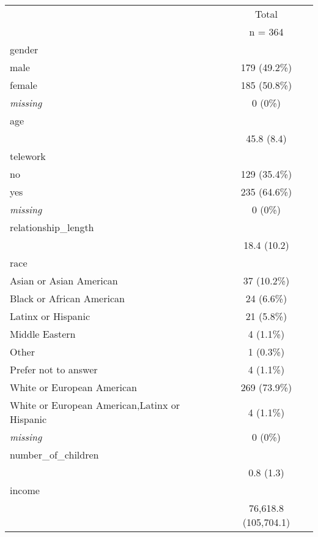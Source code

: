 \documentclass[
  english,
  man]{apa6}
\begin{document}
\begin{table}[ ht ] 
\centering 
\caption{}\label{}
\begin{tabular}{ l c }
\toprule
 &   \multicolumn{ 1 }{c}{ Total }\\ 
 & n = 364 \\ 
 \midrule
gender &  \\ 
\hspace{6pt}    male & 179 (49.2\%)\\ 
\hspace{6pt}    female & 185 (50.8\%)\\ 
\hspace{6pt}    \emph{missing} & 0 (0\%)\\ 
age &  \\ 
\hspace{6pt}   & 45.8 (8.4)\\ 
telework &  \\ 
\hspace{6pt}    no & 129 (35.4\%)\\
\hspace{6pt}    yes & 235 (64.6\%)\\ 
\hspace{6pt}    \emph{missing} & 0 (0\%)\\ 
relationship\_length &  \\ 
\hspace{6pt}   & 18.4 (10.2)\\ 
race &  \\ 
\hspace{6pt}    Asian or Asian American & 37 (10.2\%)\\ 
\hspace{6pt}    Black or African American & 24 (6.6\%)\\ 
\hspace{6pt}    Latinx or Hispanic & 21 (5.8\%)\\ 
\hspace{6pt}    Middle Eastern & 4 (1.1\%)\\ 
\hspace{6pt}    Other & 1 (0.3\%)\\ 
\hspace{6pt}    Prefer not to answer & 4 (1.1\%)\\ 
\hspace{6pt}    White or European American & 269 (73.9\%)\\ 
\hspace{6pt}    White or European American,Latinx or Hispanic & 4 (1.1\%)\\ 
\hspace{6pt}    \emph{missing} & 0 (0\%)\\ 
number\_of\_children &  \\ 
\hspace{6pt}   & 0.8 (1.3)\\ 
income &  \\ 
\hspace{6pt}   & 76,618.8 (105,704.1)\\ 
\bottomrule

\end{tabular}
\end{table}
\end{document}
